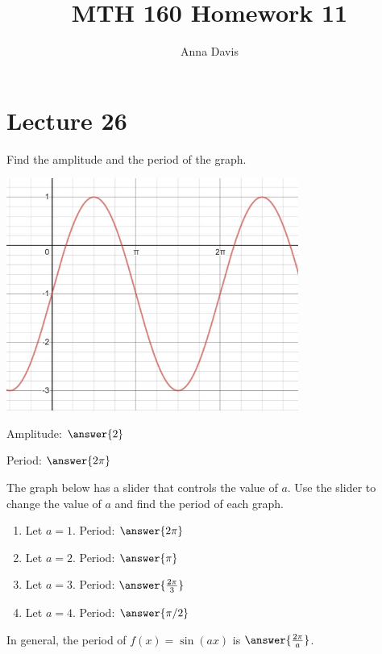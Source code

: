 \documentclass{ximera}
\author{Anna Davis} \title{MTH 160 Homework 11}
\begin{document}
\begin{abstract}

\end{abstract}
\maketitle

 \section{Lecture 26}
  \begin{problem}\label{prob:160hom11prob2}
  Find the amplitude and the period of the graph.
  \begin{image}
   
\includegraphics[height=3in]{160H11pic2.jpg}~
 
\end{image}
Amplitude: $\answer{2}$

Period: $\answer{2\pi}$
  \end{problem}
  
 \begin{problem}\label{prob:160hom11prob3}  
 The graph below has a slider that controls the value of $a$.  Use the slider to change the value of $a$ and find the period of each graph.
  \begin{center} 
\end{center}
\begin{enumerate}
    \item Let $a=1$.  Period: $\answer{2\pi}$
    \item Let $a=2$.  Period: $\answer{\pi}$
    \item Let $a=3$.  Period: $\answer{\frac{2\pi}{3}}$
    \item Let $a=4$.  Period: $\answer{\pi/2}$
\end{enumerate}
In general, the period of $f(x)=\sin (ax)$ is $\answer{\frac{2\pi}{a}}$.
\end{problem}
\end{document}
